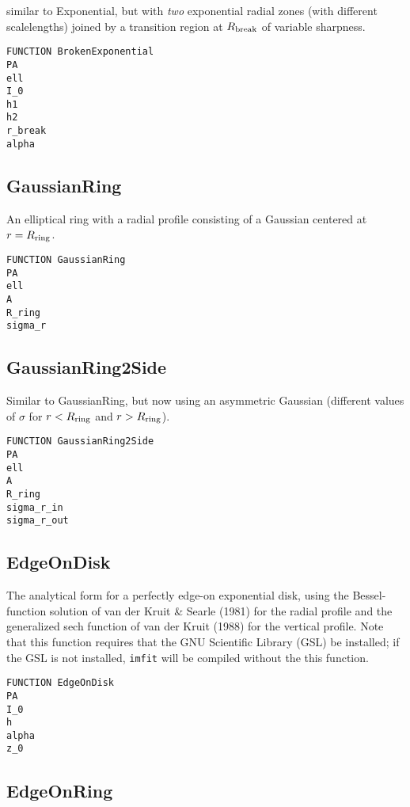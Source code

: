 \documentclass[10pt]{article}
\newcommand{\imfit}{\texttt{imfit}}
\begin{document}
similar to Exponential, but with \textit{two}
exponential radial zones (with different scalelengths) joined by a transition region
at $R_{\rm break}$ of variable sharpness.

\begin{verbatim}
FUNCTION BrokenExponential
PA
ell
I_0
h1
h2
r_break
alpha
\end{verbatim}


\subsection{GaussianRing}

An elliptical ring with a radial profile consisting of a Gaussian
centered at $r = R_{\rm ring}$.

\begin{verbatim}
FUNCTION GaussianRing
PA
ell
A
R_ring
sigma_r
\end{verbatim}


\subsection{GaussianRing2Side}

Similar to GaussianRing, but now using an asymmetric Gaussian (different
values of $\sigma$ for $r < R_{\rm ring}$ and $r > R_{\rm ring}$).

\begin{verbatim}
FUNCTION GaussianRing2Side
PA
ell
A
R_ring
sigma_r_in
sigma_r_out
\end{verbatim}


\subsection{EdgeOnDisk}

The analytical form for a perfectly edge-on exponential
disk, using the Bessel-function solution of van der Kruit \& Searle (1981) for 
the radial profile and the generalized sech function of van der Kruit (1988) 
for the vertical profile. Note that this function requires that the GNU
Scientific Library (GSL) be installed; if the GSL is not installed, \imfit{}
will be compiled without the this function.

\begin{verbatim}
FUNCTION EdgeOnDisk
PA
I_0
h
alpha
z_0
\end{verbatim}


\subsection{EdgeOnRing}
\end{document}
